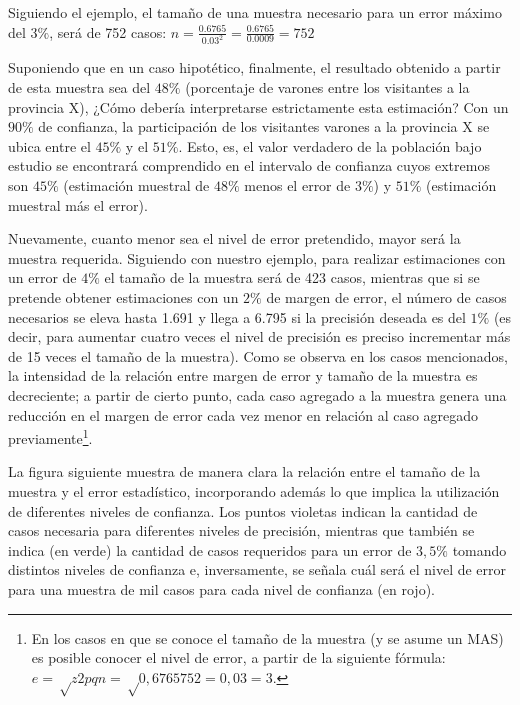 \documentclass[
]{book}
\begin{document}
Siguiendo el ejemplo, el tamaño de una muestra necesario para un error máximo del \(3\%\), será de 752 casos: \(n = \frac{0.6765}{0.03^2} = \frac{0.6765}{0.0009} = 752\)

Suponiendo que en un caso hipotético, finalmente, el resultado obtenido a partir de esta muestra sea del \(48\%\) (porcentaje de varones entre los visitantes a la provincia X), ¿Cómo debería interpretarse estrictamente esta estimación? Con un \(90\%\) de confianza, la participación de los visitantes varones a la provincia X se ubica entre el \(45\%\) y el \(51\%\). Esto, es, el valor verdadero de la población bajo estudio se encontrará comprendido en el intervalo de confianza cuyos extremos son \(45\%\) (estimación muestral de \(48\%\) menos el error de \(3\%\)) y \(51\%\) (estimación muestral más el error).

Nuevamente, cuanto menor sea el nivel de error pretendido, mayor será la muestra requerida. Siguiendo con nuestro ejemplo, para realizar estimaciones con un error de \(4\%\) el tamaño de la muestra será de 423 casos, mientras que si se pretende obtener estimaciones con un \(2\%\) de margen de error, el número de casos necesarios se eleva hasta 1.691 y llega a 6.795 si la precisión deseada es del \(1\%\) (es decir, para aumentar cuatro veces el nivel de precisión es preciso incrementar más de 15 veces el tamaño de la muestra). Como se observa en los casos mencionados, la intensidad de la relación entre margen de error y tamaño de la muestra es decreciente; a partir de cierto punto, cada caso agregado a la muestra genera una reducción en el margen de error cada vez menor en relación al caso agregado previamente\footnote{En los casos en que se conoce el tamaño de la muestra (y se asume un MAS) es posible conocer el nivel de error, a partir de la siguiente fórmula: \(e=√z2pqn=√0,6765752=0,03=3%
  \).}.

La figura siguiente muestra de manera clara la relación entre el tamaño de la muestra y el error estadístico, incorporando además lo que implica la utilización de diferentes niveles de confianza. Los puntos violetas indican la cantidad de casos necesaria para diferentes niveles de precisión, mientras que también se indica (en verde) la cantidad de casos requeridos para un error de \(3,5\%\) tomando distintos niveles de confianza e, inversamente, se señala cuál será el nivel de error para una muestra de mil casos para cada nivel de confianza (en rojo).
\end{document}
